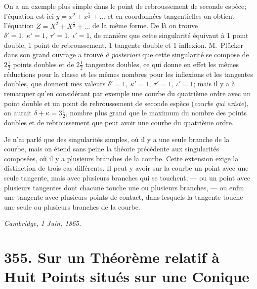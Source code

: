 \documentclass[11pt]{article}
\begin{document}
On a un exemple plus simple dans le point de rebroussement de seconde esp\`ece; l'\'equation est ici $y = x^{2} + x^{\tfrac{5}{2}} + \ldots$ et en coordonn\'ees tangentielles on obtient l'\'equation $Z = X^{2} + X^{\tfrac{5}{2}} + \ldots$ de la m\^eme forme. De l\`a on trouve $\delta' = 1,\ \kappa' = 1,\ \tau' = 1,\ \iota' = 1$, de mani\`ere que cette singularit\'e \'equivaut \`a 1 point double, 1 point de rebroussement, 1 tangente double et 1 inflexion. M.~Pl\"ucker dans son grand ouvrage a trouv\'e \textit{\`a posteriori} que cette singularit\'e se compose de $2\tfrac{1}{2}$ points doubles et de $2\tfrac{1}{2}$ tangentes doubles, ce qui donne en effet les m\^emes r\'eductions pour la classe et les m\^emes nombres pour les inflexions et les tangentes doubles, que donnent mes valeurs $\delta'=1,\ \kappa'=1,\ \tau'=1,\ \iota'=1$; mais il y a \`a remarquer qu'en consid\'erant par exemple une courbe du quatri\`eme ordre avec un point double et un point de rebroussement de seconde esp\`ece (\textit{courbe qui existe}), on aurait $\delta + \kappa = 3\tfrac{1}{2}$, nombre plus grand que le maximum du nombre des points doubles et de rebroussement que peut avoir une courbe du quatri\`eme ordre.

Je n'ai parl\'e que des singularit\'es simples, o\`u il y a une seule branche de la courbe, mais on \'etend sans peine la th\'eorie pr\'ec\'edente aux singularit\'es compos\'ees, o\`u il y a plusieurs branches de la courbe. Cette extension exige la distinction de trois cas diff\'erents. Il peut y avoir sur la courbe un point avec une seule tangente, mais avec plusieurs branches qui se touchent, --- ou un point avec plusieurs tangentes dont chacune touche une ou plusieurs branches, --- ou enfin une tangente avec plusieurs points de contact, dans lesquels la tangente touche une seule ou plusieurs branches de la courbe.

\medskip
\hfill\textit{Cambridge, 1 Juin, 1865.}


\bigskip
\section*{355. Sur un Th\'eor\`eme relatif \`a Huit Points situ\'es sur une Conique}

\end{document}
